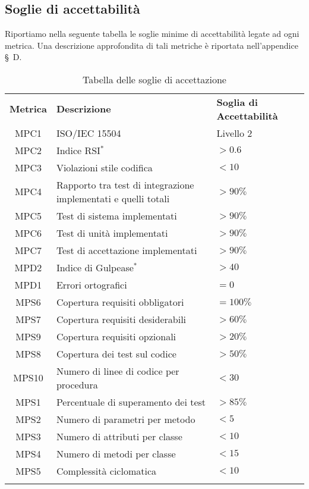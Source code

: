 \newpage

\subsection{Soglie di accettabilità}
Riportiamo nella seguente tabella le soglie minime di accettabilità legate ad ogni metrica. Una descrizione approfondita di tali metriche è riportata nell'appendice \S\ D.

\begin{longtable}{| c | p{8cm} | p{2.5cm} |}
	\rowcolor{LightBlue}
	\color{white}\bfseries Metrica & \color{white}\bfseries Descrizione &\color{white}\bfseries Soglia di \newline Accettabilità \\
	MPC1 & ISO/IEC 15504 & Livello 2 \\ \hline
	MPC2 & Indice RSI$^*$ & $> 0.6$ \\ \hline
	MPC3 & Violazioni stile codifica & $< 10$ \\ \hline
	MPC4 & Rapporto tra test di integrazione implementati e quelli totali & $> 90\%$\\ \hline
	MPC5 & Test di sistema implementati & $> 90\%$\\ \hline
	MPC6 & Test di unità implementati & $> 90\%$\\ \hline
	MPC7 & Test di accettazione implementati & $> 90\%$\\ \hline
	MPD2 & Indice di Gulpease$^*$ & $> 40$\\ \hline
	MPD1 & Errori ortografici & $= 0$\\ \hline
	MPS6 & Copertura requisiti obbligatori & $= 100\%$\\ \hline
	MPS7 & Copertura requisiti desiderabili & $> 60\%$\\ \hline
	MPS9 & Copertura requisiti opzionali & $> 20\%$\\ \hline
	MPS8 & Copertura dei test sul codice & $> 50\%$\\ \hline
	MPS10 & Numero di linee di codice per procedura & $< 30$ \\ \hline
	MPS1 & Percentuale di superamento dei test & $> 85\%$\\ \hline
	MPS2 & Numero di parametri per metodo & $< 5$\\ \hline
	MPS3 & Numero di attributi per classe & $< 10$\\ \hline
	MPS4 & Numero di metodi per classe & $< 15$\\ \hline
	MPS5 & Complessità ciclomatica & $< 10$ \\ \hline
	\caption{Tabella delle soglie di accettazione}
\end{longtable}


